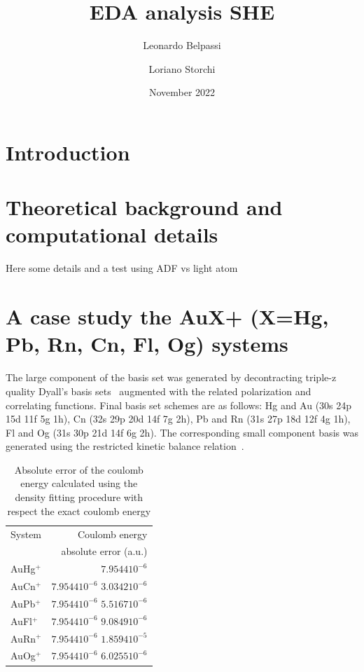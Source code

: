 \documentclass[journal=inoraj,manuscript=article]{achemso}
\title{EDA analysis SHE}
\author{Leonardo Belpassi}
\author{Loriano Storchi}
\date{November 2022}
\begin{document}
\maketitle

\section{Introduction}

\section{Theoretical background and computational details}

Here some details and a test using ADF vs light atom

\section{A case study the AuX+ (X=Hg, Pb, Rn, Cn, Fl, Og) systems  }

The large component of the basis set was generated by decontracting triple-z quality Dyall’s basis sets~\cite{missedref} 
augmented with the related polarization and correlating functions. Final basis set schemes are as follows:
 Hg and Au (30s 24p 15d 11f 5g 1h), Cn (32s 29p 20d 14f 7g 2h), Pb and Rn (31s 27p 18d 12f 4g 1h), Fl and Og (31s 30p 21d 14f 6g 2h).
 The corresponding small component basis was generated using the restricted kinetic balance relation~\cite{missedref}.

\begin{table}[!h]
\begin{tabular}{lr}
\hline
  System    & Coulomb energy \\
            & absolute error (a.u.) \\
\hline
  AuHg$^+$ & $ 7.9544 10^{-6}$ \\ \hline
  AuCn$^+$ &$ 7.9544 10^{-6}$ $ 3.0342 10^{-6}$ \\ \hline
  AuPb$^+$ &$ 7.9544 10^{-6}$ $ 5.5167 10^{-6}$ \\ \hline
  AuFl$^+$ &$ 7.9544 10^{-6}$ $ 9.0849 10^{-6}$ \\ \hline
  AuRn$^+$ &$ 7.9544 10^{-6}$ $ 1.8594 10^{-5}$ \\ \hline
  AuOg$^+$ &$ 7.9544 10^{-6}$ $ 6.0255 10^{-6}$ \\ \hline
\end{tabular}
  \caption{Absolute error of the coulomb energy calculated using the density fitting procedure
   with respect the exact coulomb energy}
  \label{energydiff}
\end{table}
\end{document}
